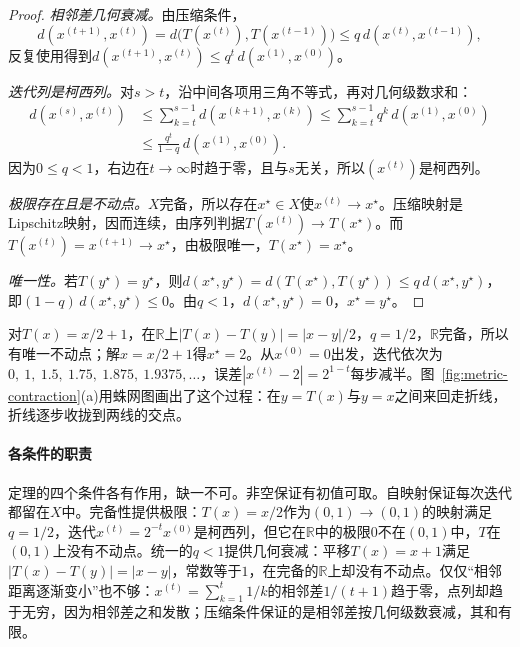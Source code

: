 \begin{proof}
\emph{相邻差几何衰减。}由压缩条件，
\[
  d(x^{(t+1)},x^{(t)})=d\bigl(T(x^{(t)}),T(x^{(t-1)})\bigr)\leq q\,d(x^{(t)},x^{(t-1)}),
\]
反复使用得到$d(x^{(t+1)},x^{(t)})\leq q^t\,d(x^{(1)},x^{(0)})$。

\emph{迭代列是柯西列。}对$s>t$，沿中间各项用三角不等式，再对几何级数求和：
\begin{equation}
\label{eq:metric-contraction-tail}
  \begin{aligned}
    d(x^{(s)},x^{(t)})&\leq\sum_{k=t}^{s-1}d(x^{(k+1)},x^{(k)})
    \leq\sum_{k=t}^{s-1}q^k\,d(x^{(1)},x^{(0)})\\
    &\leq\frac{q^t}{1-q}\,d(x^{(1)},x^{(0)}).
  \end{aligned}
\end{equation}
因为$0\leq q<1$，右边在$t\to\infty$时趋于零，且与$s$无关，所以$(x^{(t)})$是柯西列。

\emph{极限存在且是不动点。}$X$完备，所以存在$x^\star\in X$使$x^{(t)}\to x^\star$。压缩映射是Lipschitz映射，因而连续，由序列判据$T(x^{(t)})\to T(x^\star)$。而$T(x^{(t)})=x^{(t+1)}\to x^\star$，由极限唯一，$T(x^\star)=x^\star$。

\emph{唯一性。}若$T(y^\star)=y^\star$，则$d(x^\star,y^\star)=d(T(x^\star),T(y^\star))\leq q\,d(x^\star,y^\star)$，即$(1-q)\,d(x^\star,y^\star)\leq0$。由$q<1$，$d(x^\star,y^\star)=0$，$x^\star=y^\star$。
\end{proof}

对$T(x)=x/2+1$，在$\mathbb R$上$|T(x)-T(y)|=|x-y|/2$，$q=1/2$，$\mathbb R$完备，所以有唯一不动点；解$x=x/2+1$得$x^\star=2$。从$x^{(0)}=0$出发，迭代依次为$0,\ 1,\ 1.5,\ 1.75,\ 1.875,\ 1.9375,\dots$，误差$|x^{(t)}-2|=2^{1-t}$每步减半。图~\ref{fig:metric-contraction}(a)用蛛网图画出了这个过程：在$y=T(x)$与$y=x$之间来回走折线，折线逐步收拢到两线的交点。

\paragraph{各条件的职责}
定理的四个条件各有作用，缺一不可。非空保证有初值可取。自映射保证每次迭代都留在$X$中。完备性提供极限：$T(x)=x/2$作为$(0,1)\to(0,1)$的映射满足$q=1/2$，迭代$x^{(t)}=2^{-t}x^{(0)}$是柯西列，但它在$\mathbb R$中的极限$0$不在$(0,1)$中，$T$在$(0,1)$上没有不动点。统一的$q<1$提供几何衰减：平移$T(x)=x+1$满足$|T(x)-T(y)|=|x-y|$，常数等于$1$，在完备的$\mathbb R$上却没有不动点。仅仅“相邻距离逐渐变小”也不够：$x^{(t)}=\sum_{k=1}^t1/k$的相邻差$1/(t+1)$趋于零，点列却趋于无穷，因为相邻差之和发散；压缩条件保证的是相邻差按几何级数衰减，其和有限。

